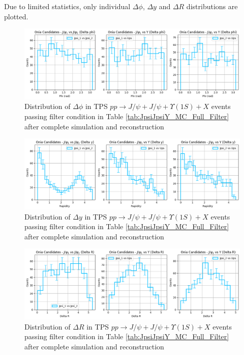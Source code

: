 \documentclass[10pt,twocolumn]{article}
\begin{document}
Due to limited statistics, only individual $\Delta \phi$, $\Delta y$ and $\Delta R$ distributions are plotted. 

\begin{figure}
    \centering
    \includegraphics[width=1.0\linewidth]{images/Ntuple_LEVEL_TPS_DeltaPhi_filtered.png}
    \caption{Distribution of $\Delta \phi$ in TPS $pp\to J/\psi+J/\psi+\Upsilon(1S)+X$ events passing filter condition in Table \ref{tab:JpsiJpsiY_MC_Full_Filter} after complete simulation and reconstruction}
    \label{fig:TPS_JJY1S_filtered_DeltaPhi_Ntuple}
\end{figure}

\begin{figure}
    \centering
    \includegraphics[width=1.0\linewidth]{images/Ntuple_LEVEL_TPS_DeltaY_filtered.png}
    \caption{Distribution of $\Delta y$ in TPS $pp\to J/\psi+J/\psi+\Upsilon(1S)+X$ events passing filter condition in Table \ref{tab:JpsiJpsiY_MC_Full_Filter} after complete simulation and reconstruction}
    \label{fig:TPS_JJY1S_filtered_DeltaY_Ntuple}
\end{figure}

\begin{figure}
    \centering
    \includegraphics[width=1.0\linewidth]{images/Ntuple_LEVEL_TPS_DeltaR_filtered.png}
    \caption{Distribution of $\Delta R$ in TPS $pp\to J/\psi+J/\psi+\Upsilon(1S)+X$ events passing filter condition in Table \ref{tab:JpsiJpsiY_MC_Full_Filter} after complete simulation and reconstruction}
    \label{fig:TPS_JJY1S_filtered_DeltaR_Ntuple}
\end{figure}
\end{document}
